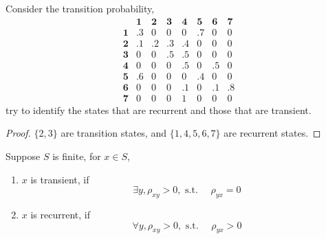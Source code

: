 \begin{example}
	Consider the transition probability,
	\begin{equation*}
		\begin{array}{cccccccc}
			           & \mathbf{1} & \mathbf{2} & \mathbf{3} & \mathbf{4} & \mathbf{5} & \mathbf{6} & \mathbf{7} \\
			\mathbf{1} & .3         & 0          & 0          & 0          & .7         & 0          & 0          \\
			\mathbf{2} & .1         & .2         & .3         & .4         & 0          & 0          & 0          \\
			\mathbf{3} & 0          & 0          & .5         & .5         & 0          & 0          & 0          \\
			\mathbf{4} & 0          & 0          & 0          & .5         & 0          & .5         & 0          \\
			\mathbf{5} & .6         & 0          & 0          & 0          & .4         & 0          & 0          \\
			\mathbf{6} & 0          & 0          & 0          & .1         & 0          & .1         & .8         \\
			\mathbf{7} & 0          & 0          & 0          & 1          & 0          & 0          & 0
		\end{array}
	\end{equation*}
	try to identify the states that are recurrent and those that are transient.
\end{example}

\begin{proof}
	$\{2,3\}$ are transition states, and $\{1,4,5,6,7\}$ are recurrent states.
\end{proof}

\begin{remark}
	Suppose $S$ is finite, for $x\in S$,
	\begin{enumerate}
		\item $x$ is transient, if
		      \begin{equation*}
			      \exists y,\rho_{xy}>0,\text{ s.t. }\quad\rho_{yx}=0
		      \end{equation*}
		\item $x$ is recurrent, if
		      \begin{equation*}
			      \forall y,\rho_{xy}>0,\text{ s.t. }\quad\rho_{yx}>0
		      \end{equation*}
	\end{enumerate}
\end{remark}

